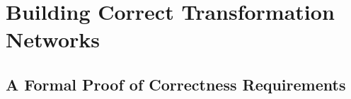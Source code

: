 \part{Building Correct Transformation Networks }


\chapter{A Formal Proof of Correctness Requirements
}





